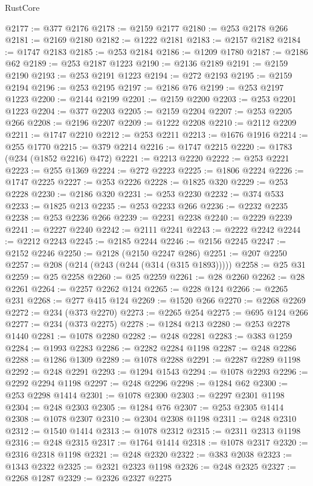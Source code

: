 \begin{lexlean}{RustCore}
\begin{coremodule}
@2177 := @377 @2176
@2178 := @2159 @2177
@2180 := @253 @2178 @266
@2181 := @2169 @2180
@2182 := @1222 @2181
@2183 := @2157 @2182
@2184 := @1747 @2183
@2185 := @253 @2184
@2186 := @1209 @1780
@2187 := @2186 @62
@2189 := @253 @2187 @1223
@2190 := @2136 @2189
@2191 := @2159 @2190
@2193 := @253 @2191 @1223
@2194 := @272 @2193
@2195 := @2159 @2194
@2196 := @253 @2195
@2197 := @2186 @76
@2199 := @253 @2197 @1223
@2200 := @2144 @2199
@2201 := @2159 @2200
@2203 := @253 @2201 @1223
@2204 := @377 @2203
@2205 := @2159 @2204
@2207 := @253 @2205 @266
@2208 := @2196 @2207
@2209 := @1222 @2208
@2210 := @2112 @2209
@2211 := @1747 @2210
@2212 := @253 @2211
@2213 := @1676 @1916
@2214 := @255 @1770
@2215 := @379 @2214
@2216 := @1747 @2215
@2220 := @1783 (@234 (@1852 @2216) @472)
@2221 := @2213 @2220
@2222 := @253 @2221
@2223 := @255 @1369
@2224 := @272 @2223
@2225 := @1806 @2224
@2226 := @1747 @2225
@2227 := @253 @2226
@2228 := @1825 @320
@2229 := @253 @2228
@2230 := @2186 @320
@2231 := @253 @2230
@2232 := @374 @533
@2233 := @1825 @213
@2235 := @253 @2233 @266
@2236 := @2232 @2235
@2238 := @253 @2236 @266
@2239 := @2231 @2238
@2240 := @2229 @2239
@2241 := @2227 @2240
@2242 := @2111 @2241
@2243 := @2222 @2242
@2244 := @2212 @2243
@2245 := @2185 @2244
@2246 := @2156 @2245
@2247 := @2152 @2246
@2250 := @2128 (@2150 @2247 @286)
@2251 := @207 @2250
@2257 := @208 (@214 (@243 (@244 (@314 (@315 @1893)))))
@2258 := @25 @31
@2259 := @25 @2258
@2260 := @25 @2259
@2261 := @28 @2260
@2262 := @28 @2261
@2264 := @2257 @2262 @124
@2265 := @228 @124
@2266 := @2265 @231
@2268 := @277 @415 @124
@2269 := @1520 @266
@2270 := @2268 @2269
@2272 := @234 (@373 @2270)
@2273 := @2265 @254
@2275 := @695 @124 @266
@2277 := @234 (@373 @2275)
@2278 := @1284 @213
@2280 := @253 @2278 @1440
@2281 := @1078 @2280
@2282 := @248 @2281
@2283 := @383 @1259
@2284 := @1993 @2283
@2286 := @2282 @2284 @1198
@2287 := @248 @2286
@2288 := @1286 @1309
@2289 := @1078 @2288
@2291 := @2287 @2289 @1198
@2292 := @248 @2291
@2293 := @1294 @1543
@2294 := @1078 @2293
@2296 := @2292 @2294 @1198
@2297 := @248 @2296
@2298 := @1284 @62
@2300 := @253 @2298 @1414
@2301 := @1078 @2300
@2303 := @2297 @2301 @1198
@2304 := @248 @2303
@2305 := @1284 @76
@2307 := @253 @2305 @1414
@2308 := @1078 @2307
@2310 := @2304 @2308 @1198
@2311 := @248 @2310
@2312 := @1540 @1414
@2313 := @1078 @2312
@2315 := @2311 @2313 @1198
@2316 := @248 @2315
@2317 := @1764 @1414
@2318 := @1078 @2317
@2320 := @2316 @2318 @1198
@2321 := @248 @2320
@2322 := @383 @2038
@2323 := @1343 @2322
@2325 := @2321 @2323 @1198
@2326 := @248 @2325
@2327 := @2268 @1287
@2329 := @2326 @2327 @2275

\end{coremodule}
\end{lexlean}
